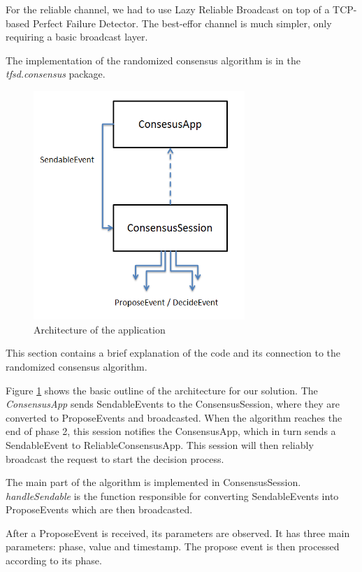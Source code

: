 \documentclass[times, 12pt,twocolumn]{article}
\begin{document}
For the reliable channel, we had to use Lazy Reliable Broadcast on top
of a TCP-based Perfect Failure Detector. The best-effor channel is much simpler, 
only requiring a basic broadcast layer.

The implementation of the randomized consensus algorithm is in the 
\textit{tfsd.consensus} package. 


\begin{figure}[ht!]
\centering
\includegraphics[width=80mm]{arch.png}
\caption{Architecture of the application}
\label{fig:arch}
\end{figure}

This section contains a brief explanation of the code and its connection 
to the randomized consensus algorithm.
 
Figure \ref{fig:arch} shows the basic outline of the architecture for our 
solution. The \textit{ConsensusApp} sends SendableEvents to the ConsensusSession, 
where they are converted to ProposeEvents and broadcasted. When the algorithm 
reaches the end of phase 2, this session notifies the ConsensusApp, which in turn 
sends a SendableEvent to ReliableConsensusApp. This session will then reliably 
broadcast the request to start the decision process.

The main part of the algorithm is implemented in ConsensusSession. 
\textit{handleSendable} is the function responsible for converting SendableEvents 
into ProposeEvents which are then broadcasted.

After a ProposeEvent is received, its parameters are observed. It has three main 
parameters: phase, value and timestamp. The propose event is then processed according 
to its phase.
\end{document}
